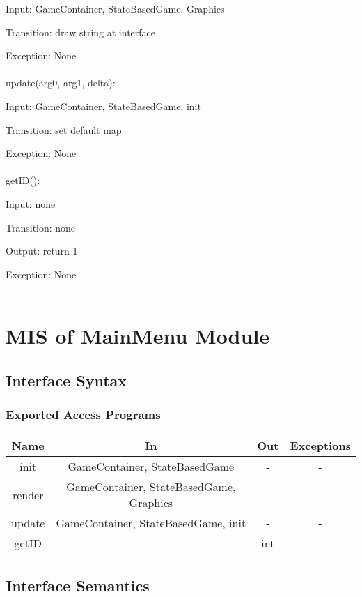 \documentclass[12,english]{article}
\begin{document}
		Input: GameContainer, StateBasedGame, Graphics
		
		Transition: draw string at interface
		
		Exception: None\\
		\\	
		update(arg0, arg1, delta):
		
		Input: GameContainer, StateBasedGame, init
		
		Transition: set default map
		
		Exception: None\\
		\\
		getID():
		
		Input: none
		
		Transition: none
		
		Output: return 1
		
		Exception: None\\
		\\
\section{MIS of MainMenu Module}
	\subsection{Interface Syntax}
	
		\subsubsection{Exported Access Programs}
		
	\begin{tabular}[pos]{|c|c|c|c|}
	\hline
	\textbf{Name}& \textbf{In} & \textbf{Out} & \textbf{Exceptions} \\ 
	\hline
	init & GameContainer, StateBasedGame & - & - \\ \hline
	render & GameContainer, StateBasedGame, Graphics & - & - \\ \hline
	update & GameContainer, StateBasedGame, init & - & - \\ \hline
	getID & - & int & - \\ \hline
	
	
					
	\end{tabular}		
		
	\subsection{Interface Semantics}
\end{document}
